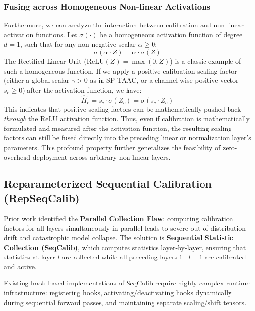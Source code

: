 \documentclass{article}
\begin{document}
\subsubsection{Fusing across Homogeneous Non-linear Activations}
Furthermore, we can analyze the interaction between calibration and non-linear activation functions. Let $\sigma( \cdot )$ be a homogeneous activation function of degree $d = 1$, such that for any non-negative scalar $\alpha \ge 0$:
\begin{equation}
    \sigma(\alpha \cdot Z) = \alpha \cdot \sigma(Z)
\end{equation}
The Rectified Linear Unit ($\text{ReLU}(Z) = \max(0, Z)$) is a classic example of such a homogeneous function. 
If we apply a positive calibration scaling factor (either a global scalar $\gamma > 0$ as in SP-TAAC, or a channel-wise positive vector $s_c \ge 0$) after the activation function, we have:
\begin{equation}
    \hat{H}_c = s_c \cdot \sigma(Z_c) = \sigma(s_c \cdot Z_c)
\end{equation}
This indicates that positive scaling factors can be mathematically pushed back \textit{through} the ReLU activation function. Thus, even if calibration is mathematically formulated and measured after the activation function, the resulting scaling factors can still be fused directly into the preceding linear or normalization layer's parameters. This profound property further generalizes the feasibility of zero-overhead deployment across arbitrary non-linear layers.

\subsection{Reparameterized Sequential Calibration (RepSeqCalib)}
Prior work \cite{anonymous2026b} identified the \textbf{Parallel Collection Flaw}: computing calibration factors for all layers simultaneously in parallel leads to severe out-of-distribution drift and catastrophic model collapse. The solution is \textbf{Sequential Statistic Collection (SeqCalib)}, which computes statistics layer-by-layer, ensuring that statistics at layer $l$ are collected while all preceding layers $1 \dots l-1$ are calibrated and active.

Existing hook-based implementations of SeqCalib require highly complex runtime infrastructure: registering hooks, activating/deactivating hooks dynamically during sequential forward passes, and maintaining separate scaling/shift tensors.
\end{document}
